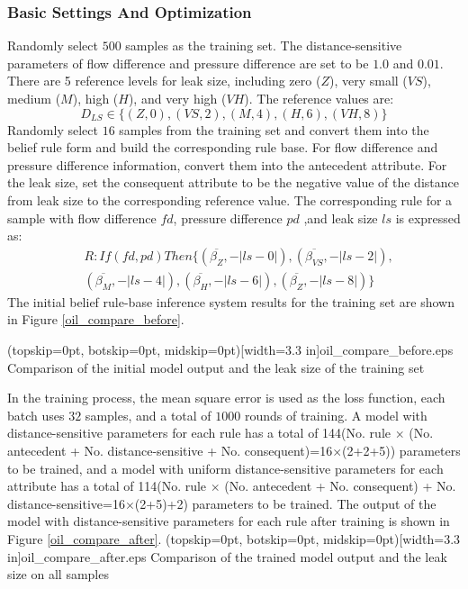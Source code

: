 \documentclass{ieeeaccess}
\begin{document}
\subsubsection{Basic Settings And Optimization}
Randomly select $500$ samples as the training set.
The distance-sensitive parameters of flow difference and pressure difference are set to be $1.0$ and $0.01$.
There are 5 reference levels for leak size, including zero ($Z$), very small ($VS$), medium ($M$), high ($H$), and very high ($VH$).
The reference values are:
\begin{equation}
    D_{LS}\in \{(Z,0),(VS,2),(M,4),(H,6),(VH,8)\}
\end{equation}
Randomly select $16$ samples from the training set and convert them into the belief rule form and build the corresponding rule base.
For flow difference and pressure difference information, convert them into the antecedent attribute.
For the leak size, set the consequent attribute to be the negative value of the distance from leak size to the corresponding reference value.
The corresponding rule for a sample with flow difference $fd$, pressure difference $pd$ ,and leak size $ls$ is expressed as:
\begin{equation}
    \begin{split}
        &R:If(fd,pd)Then\{(\overline{\beta_{Z}},-|ls-0|),(\overline{\beta_{VS}},-|ls-2|),\\
        &(\overline{\beta_{M}},-|ls-4|),(\overline{\beta_{H}},-|ls-6|),(\overline{\beta_{Z}},-|ls-8|)\}
    \end{split}
\end{equation}
The initial belief rule-base inference system results for the training set are shown in Figure \ref{oil_compare_before}.

\Figure[!t](topskip=0pt, botskip=0pt, midskip=0pt)[width=3.3 in]{oil_compare_before.eps}
{Comparison of the initial model output and the leak size of the training set\label{oil_compare_before}}

In the training process, the mean square error is used as the loss function, each batch uses $32$ samples, and a total of $1000$ rounds of training.
A model with distance-sensitive parameters for each rule has a total of 144(No. rule $\times$ (No. antecedent + No. distance-sensitive + No. consequent)=16$\times$(2+2+5)) parameters to be trained,
and a model with uniform distance-sensitive parameters for each attribute has a total of 114(No. rule $\times$ (No. antecedent + No. consequent) + No. distance-sensitive=16$\times$(2+5)+2) parameters to be trained.
The output of the model with distance-sensitive parameters for each rule after training is shown in Figure \ref{oil_compare_after}.
\Figure[!t](topskip=0pt, botskip=0pt, midskip=0pt)[width=3.3 in]{oil_compare_after.eps}
{Comparison of the trained model output and the leak size on all samples\label{oil_compare_after}}
\end{document}
